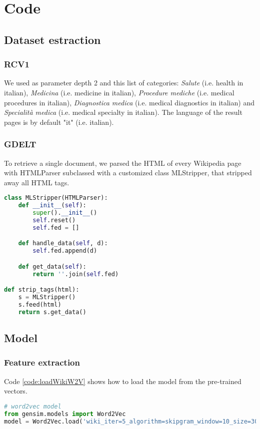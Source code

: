 \appendix
\chapter{Code}

\section{Dataset estraction}

\subsection{RCV1}
\label{appendix:petscanQuery}
We used as parameter depth 2 and this list of categories: \textit{Salute} (i.e. health in italian), \textit{Medicina} (i.e. medicine in italian),  \textit{Procedure mediche} (i.e. medical procedures in italian),  \textit{Diagnostica medica} (i.e. medical diagnostics in italian) and \textit{Specialità medica} (i.e. medical specialty in italian). The language of the result pages is by default "it" (i.e. italian).


\subsection{GDELT}
\label{appendix:MLStripper}
To retrieve a single document, we parsed the HTML of every Wikipedia page with HTMLParser subclassed with a customized class MLStripper, that stripped away all HTML tags.
\begin{lstlisting}[language=Python]
class MLStripper(HTMLParser):
    def __init__(self):
        super().__init__()
        self.reset()
        self.fed = []

    def handle_data(self, d):
        self.fed.append(d)

    def get_data(self):
        return ''.join(self.fed)

def strip_tags(html):
    s = MLStripper()
    s.feed(html)
    return s.get_data()

\end{lstlisting}

\section{Model}

\subsection{Feature extraction}
\label{appendix:loadWikiW2V}
Code \ref{code:loadWikiW2V} shows how to load the model from the pre-trained vectors.
\begin{lstlisting}[caption={How to load Wikipedia pre-trained model}, label={code:loadWikiW2V}, language=Python, breaklines=true, frame=single] 
# word2vec model
from gensim.models import Word2Vec
model = Word2Vec.load('wiki_iter=5_algorithm=skipgram_window=10_size=300_neg-samples=10.m')
\end{lstlisting}

